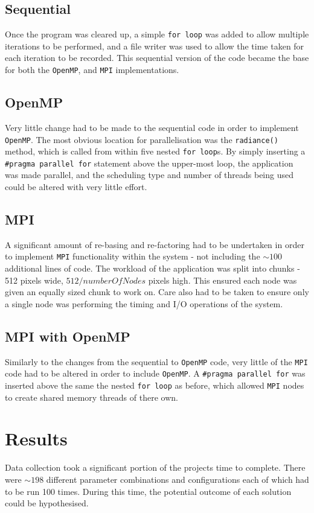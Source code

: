 \documentclass[journal,transmag]{IEEEtran}
\begin{document}
	\subsection{Sequential}
		Once the program was cleared up, a simple \texttt{for loop} was added to allow multiple iterations to be performed, and a file writer was used to allow the time taken for each iteration to be recorded. This sequential version of the code became the base for both the \texttt{OpenMP}, and \texttt{MPI} implementations.
	
	\subsection{OpenMP}
		Very little change had to be made to the sequential code in order to implement \texttt{OpenMP}. The most obvious location for parallelisation was the \texttt{radiance()} method, which is called from within five nested \texttt{for loop}s. By simply inserting a \texttt{\#pragma parallel for} statement above the upper-most loop, the application was made parallel, and the scheduling type and number of threads being used could be altered with very little effort.
		
	\subsection{MPI}
		A significant amount of re-basing and re-factoring had to be undertaken in order to implement \texttt{MPI} functionality within the system - not including the $\sim100$ additional lines of code. The workload of the application was split into chunks - 512 pixels wide, \(512 / number Of Nodes\) pixels high. This ensured each node was given an equally sized chunk to work on. Care also had to be taken to ensure only a single node was performing the timing and I/O operations of the system.
		
	\subsection{MPI with OpenMP}
		Similarly to the changes from the sequential to \texttt{OpenMP} code, very little of the \texttt{MPI} code had to be altered in order to include \texttt{OpenMP}. A \texttt{\#pragma parallel for} was inserted above the same the nested \texttt{for loop} as before, which allowed \texttt{MPI} nodes to create shared memory threads of there own. 
	
\section{Results}
	Data collection took a significant portion of the projects time to complete. There were $\sim198$ different parameter combinations and configurations each of which had to be run 100 times. During this time, the potential outcome of each solution could be hypothesised.
	
\end{document}
